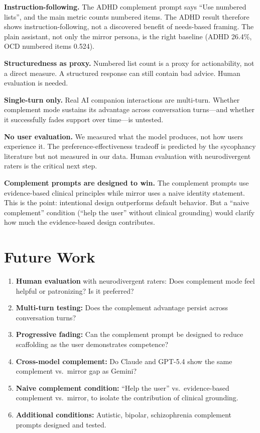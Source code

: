 \documentclass[conference]{IEEEtran}
\begin{document}
\textbf{Instruction-following.} The ADHD complement prompt says ``Use numbered lists'', and the main metric counts numbered items. The ADHD result therefore shows instruction-following, not a discovered benefit of needs-based framing. The plain assistant, not only the mirror persona, is the right baseline (ADHD 26.4\%, OCD numbered items 0.524).

\textbf{Structuredness as proxy.} Numbered list count is a proxy for actionability, not a direct measure. A structured response can still contain bad advice. Human evaluation is needed.

\textbf{Single-turn only.} Real AI companion interactions are multi-turn. Whether complement mode sustains its advantage across conversation turns---and whether it successfully fades support over time---is untested.

\textbf{No user evaluation.} We measured what the model produces, not how users experience it. The preference-effectiveness tradeoff is predicted by the sycophancy literature but not measured in our data. Human evaluation with neurodivergent raters is the critical next step.

\textbf{Complement prompts are designed to win.} The complement prompts use evidence-based clinical principles while mirror uses a naive identity statement. This is the point: intentional design outperforms default behavior. But a ``naive complement'' condition (``help the user'' without clinical grounding) would clarify how much the evidence-based design contributes.

\section{Future Work}

\begin{enumerate}
    \item \textbf{Human evaluation} with neurodivergent raters: Does complement mode feel helpful or patronizing? Is it preferred?
    \item \textbf{Multi-turn testing:} Does the complement advantage persist across conversation turns?
    \item \textbf{Progressive fading:} Can the complement prompt be designed to reduce scaffolding as the user demonstrates competence?
    \item \textbf{Cross-model complement:} Do Claude and GPT-5.4 show the same complement vs.\ mirror gap as Gemini?
    \item \textbf{Naive complement condition:} ``Help the user'' vs.\ evidence-based complement vs.\ mirror, to isolate the contribution of clinical grounding.
    \item \textbf{Additional conditions:} Autistic, bipolar, schizophrenia complement prompts designed and tested.
\end{enumerate}
\end{document}
